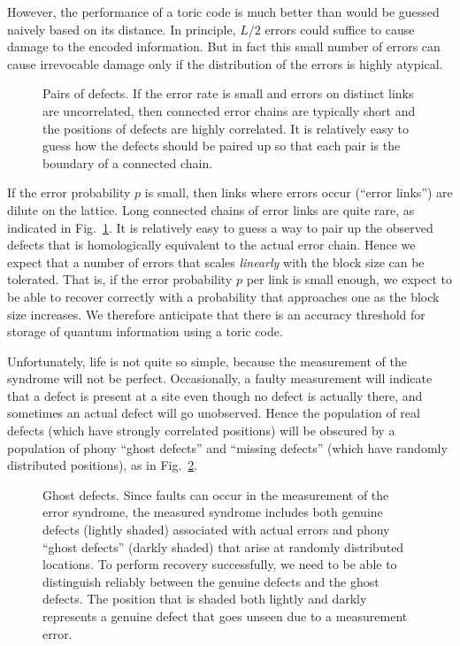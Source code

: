 However, the performance of a toric code is much better than would be guessed naively based on its distance. In principle, $L/2$ errors could suffice to cause damage to the encoded information. But in fact this small number of errors can cause irrevocable damage only if the distribution of the errors is highly atypical.

\begin{figure}
\begin{center}
\leavevmode
\epsfxsize=3in
\end{center}
\caption{Pairs of defects. If the error rate is small and errors on distinct links are uncorrelated, then connected error chains are typically short and the positions of defects are highly correlated. It is relatively easy to guess how the defects should be paired up so that each pair is the boundary of a connected chain.}
\label{fig_dilute}
\end{figure}

If the error probability $p$ is small, then links where errors occur (``error links'') are dilute on the lattice. Long connected chains of error links are quite rare, as indicated in Fig.~\ref{fig_dilute}. It is relatively easy to guess a way to pair up the observed defects that is homologically equivalent to the actual error chain. Hence we expect that a number of errors that scales {\em linearly} with the block size can be tolerated.  That is, if the error probability $p$ per link is small enough, we expect to be able to recover correctly with a probability that approaches one as the block size increases. We therefore anticipate that there is an accuracy threshold for storage of quantum information using a toric code.

Unfortunately, life is not quite so simple, because the measurement of the syndrome will not be perfect. Occasionally, a faulty measurement will indicate that a defect is present at a site even though no defect is actually there, and sometimes an actual defect will go unobserved. Hence the population of real defects (which have strongly correlated positions) will be obscured by a population of phony ``ghost defects'' and ``missing defects'' (which have randomly distributed positions), as in Fig.~\ref{fig_ghosts}.

\begin{figure}
\begin{center}
\leavevmode
\epsfxsize=3in
\end{center}
\caption{Ghost defects. Since faults can occur in the measurement of the error syndrome, the measured syndrome includes both genuine defects (lightly shaded) associated with actual errors and phony ``ghost defects'' (darkly shaded) that arise at randomly distributed locations. To perform recovery successfully, we need to be able to distinguish reliably between the genuine defects and the ghost defects. The position that is shaded both lightly and darkly represents a genuine defect that goes unseen due to a measurement error.}
\label{fig_ghosts}
\end{figure}

